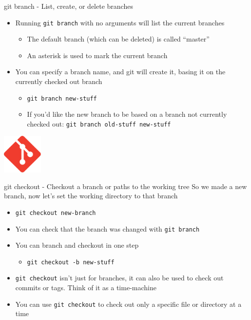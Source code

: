 \documentclass[aspectratio=43]{beamer}
\begin{document}
\begin{frame}{git branch - List, create, or delete branches}
    \begin{itemize}
    \item Running \texttt{git branch} with no arguments will list the current
        branches
        \begin{itemize}
        \item The default branch (which can be deleted) is called ``master''
        \item An asterisk is used to mark the current branch
        \end{itemize}
    \item You can specify a branch name, and git will create it, basing it on
        the currently checked out branch
        \begin{itemize}
        \item \texttt{git branch new-stuff}
        \item If you'd like the new branch to be based on a branch not currently
            checked out: \texttt{git branch old-stuff new-stuff}
        \end{itemize}
    \end{itemize}

    \begin{flushright}
        \includegraphics[height=2cm]{resources/git_icon.pdf}
    \end{flushright}
\end{frame}

\begin{frame}{git checkout - Checkout a branch or paths to the working tree}
    So we made a new branch, now let's set the working directory to that branch
    \begin{itemize}
    \item \texttt{git checkout new-branch}
    \item You can check that the branch was changed with \texttt{git branch}
    \item You can branch and checkout in one step
        \begin{itemize}
        \item \texttt{git checkout -b new-stuff}
        \end{itemize}
    \item \texttt{git checkout} isn't just for branches, it can also be used to
        check out commits or tags. Think of it as a time-machine
    \item You can use \texttt{git checkout} to check out only a specific file or
        directory at a time
    \end{itemize}
\end{frame}
\end{document}
